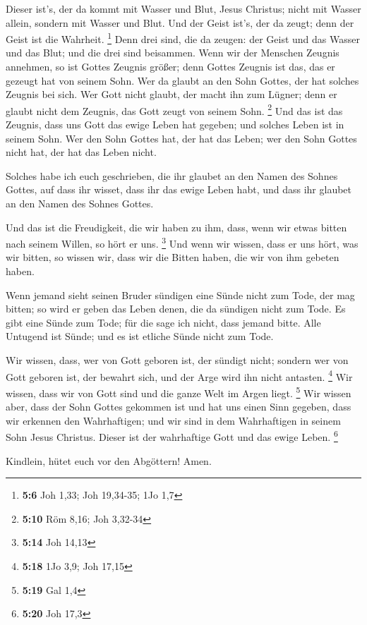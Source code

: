  Dieser ist's, der da kommt mit Wasser und Blut, Jesus
Christus; nicht mit Wasser allein, sondern mit Wasser und Blut. Und der
Geist ist's, der da zeugt; denn der Geist ist die Wahrheit. \footnote{\textbf{5:6}
  Joh 1,33; Joh 19,34-35; 1Jo 1,7}  Denn drei sind, die da
zeugen: der Geist und das Wasser und das Blut;  und die
drei sind beisammen.  Wenn wir der Menschen Zeugnis
annehmen, so ist Gottes Zeugnis größer; denn Gottes Zeugnis ist das, das
er gezeugt hat von seinem Sohn.  Wer da glaubt an den
Sohn Gottes, der hat solches Zeugnis bei sich. Wer Gott nicht glaubt,
der macht ihn zum Lügner; denn er glaubt nicht dem Zeugnis, das Gott
zeugt von seinem Sohn. \footnote{\textbf{5:10} Röm 8,16; Joh 3,32-34}
 Und das ist das Zeugnis, dass uns Gott das ewige Leben
hat gegeben; und solches Leben ist in seinem Sohn.  Wer
den Sohn Gottes hat, der hat das Leben; wer den Sohn Gottes nicht hat,
der hat das Leben nicht.

 Solches habe ich euch geschrieben, die ihr glaubet an
den Namen des Sohnes Gottes, auf dass ihr wisset, dass ihr das ewige
Leben habt, und dass ihr glaubet an den Namen des Sohnes Gottes.

 Und das ist die Freudigkeit, die wir haben zu ihm, dass,
wenn wir etwas bitten nach seinem Willen, so hört er uns. \footnote{\textbf{5:14}
  Joh 14,13}  Und wenn wir wissen, dass er uns hört, was
wir bitten, so wissen wir, dass wir die Bitten haben, die wir von ihm
gebeten haben.

 Wenn jemand sieht seinen Bruder sündigen eine Sünde
nicht zum Tode, der mag bitten; so wird er geben das Leben denen, die da
sündigen nicht zum Tode. Es gibt eine Sünde zum Tode; für die sage ich
nicht, dass jemand bitte.  Alle Untugend ist Sünde; und
es ist etliche Sünde nicht zum Tode.

 Wir wissen, dass, wer von Gott geboren ist, der sündigt
nicht; sondern wer von Gott geboren ist, der bewahrt sich, und der Arge
wird ihn nicht antasten. \footnote{\textbf{5:18} 1Jo 3,9; Joh 17,15}
 Wir wissen, dass wir von Gott sind und die ganze Welt im
Argen liegt. \footnote{\textbf{5:19} Gal 1,4}  Wir wissen
aber, dass der Sohn Gottes gekommen ist und hat uns einen Sinn gegeben,
dass wir erkennen den Wahrhaftigen; und wir sind in dem Wahrhaftigen in
seinem Sohn Jesus Christus. Dieser ist der wahrhaftige Gott und das
ewige Leben. \footnote{\textbf{5:20} Joh 17,3}

 Kindlein, hütet euch vor den Abgöttern! Amen.
